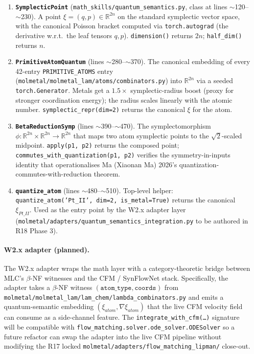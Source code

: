 \begin{enumerate}
  \item \textbf{\texttt{SymplecticPoint}}
    (\texttt{math\_skills/quantum\_semantics.py}, class at lines
    $\sim$120--$\sim$230).  A point
    $\xi = (q, p) \in \mathbb{R}^{2n}$ on the standard symplectic
    vector space, with the canonical Poisson bracket computed
    via \texttt{torch.autograd} (the derivative w.r.t.\ the
    leaf tensors $q, p$).  \texttt{dimension()} returns $2n$;
    \texttt{half\_dim()} returns $n$.

  \item \textbf{\texttt{PrimitiveAtomQuantum}}
    (lines $\sim$280--$\sim$370).  The canonical embedding of
    every 42-entry \texttt{PRIMITIVE\_ATOMS} entry
    (\texttt{molmetal/molmetal\_lam/atoms/combinators.py}) into
    $\mathbb{R}^{2n}$ via a seeded \texttt{torch.Generator}.  Metals get
    a $1.5\times$ symplectic-radius boost (proxy for stronger
    coordination energy); the radius scales linearly with the
    atomic number.  \texttt{symplectic\_repr(dim=2)} returns the
    canonical $\xi$ for the atom.

  \item \textbf{\texttt{BetaReductionSymp}}
    (lines $\sim$390--$\sim$470).  The symplectomorphism
    $\phi: \mathbb{R}^{2n} \times \mathbb{R}^{2n} \to \mathbb{R}^{2n}$ that maps two
    atom symplectic points to the $\sqrt{2}$-scaled midpoint.
    \texttt{apply(p1, p2)} returns the composed point;
    \texttt{commutes\_with\_quantization(p1, p2)} verifies the
    symmetry-in-inputs identity that operationalises Ma
    (Xiaonan Ma) 2026's quantization-commutes-with-reduction theorem.

  \item \textbf{\texttt{quantize\_atom}} (lines $\sim$480--$\sim$510).
    Top-level helper: \texttt{quantize\_atom('Pt\_II', dim=2,
    is\_metal=True)} returns the canonical $\xi_{Pt\_II}$.
    Used as the entry point by the W2.x adapter layer
    (\texttt{molmetal/adapters/quantum\_semantics\_integration.py}
    to be authored in R18 Phase 3).
\end{enumerate}

\paragraph{W2.x adapter (planned).}
The W2.x adapter wraps the math layer with a category-theoretic
bridge between MLC's $\beta$-NF witnesses and the CFM / SynFlowNet
stack.  Specifically, the adapter takes a $\beta$-NF witness
$(\texttt{atom\_type}, \texttt{coords})$ from
\texttt{molmetal/molmetal\_lam/lam\_chem/lambda\_combinators.py}
and emits a quantum-semantic embedding
$(\xi_{atom}, \nabla \xi_{atom})$ that the live CFM velocity
field can consume as a side-channel feature.  The
\texttt{integrate\_with\_cfm(\dots)} signature will be compatible
with \texttt{flow\_matching.solver.ode\_solver.ODESolver} so a
future refactor can swap the adapter into the live CFM pipeline
without modifying the R17 locked
\texttt{molmetal/adapters/flow\_matching\_lipman/} close-out.

